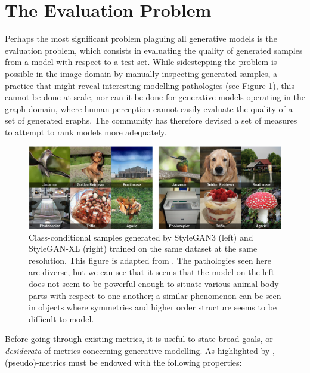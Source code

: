 \section{The Evaluation Problem}\label{sec:evalproblem}

Perhaps the most significant problem plaguing all generative models is the
evaluation problem, which consists in evaluating the quality of generated
samples from a model with respect to a test set. While sidestepping the problem
is possible in the image domain by manually inspecting generated samples, a
practice that might reveal interesting modelling pathologies (see Figure
\ref{fig:ganpathologies}), this cannot be done at scale, nor can it be done for
generative models operating in the graph domain, where human perception cannot
easily evaluate the quality of a set of generated graphs. The community has
therefore devised a set of measures to attempt to rank models more adequately.

\begin{figure}
  \centering
  \includegraphics[width=\textwidth]{figures/pathologies.png}
  \caption[Class-conditional samples from StyleGAN3 and
  StyleGAN-XL]{Class-conditional samples generated by StyleGAN3 (left) and
    StyleGAN-XL (right) trained on the same dataset at the same resolution. This
    figure is adapted from \cite{sauer2022stylegan}. The pathologies seen here
    are diverse, but we can see that it seems that the model on the left does
    not seem to be powerful enough to situate various animal body parts with
    respect to one another; a similar phenomenon can be seen in objects where
    symmetries and higher order structure seems to be difficult to model.}
  \label{fig:ganpathologies}
\end{figure}

Before going through existing metrics, it is useful to state broad goals, or
\emph{desiderata} of metrics concerning generative modelling. As highlighted by
\cite{obray2022evaluation}, (pseudo)-metrics must be endowed with the following
properties:

